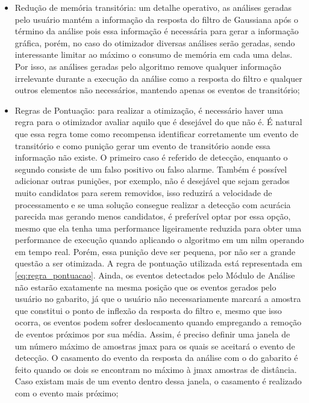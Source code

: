 \begin{itemize}

\item Redução de memória transitória: um detalhe operativo, as
análises geradas pelo usuário mantém a informação da resposta do
filtro de Gaussiana após o término da análise pois essa informação é
necessária para gerar a informação gráfica, porém, no caso do
otimizador diversas análises serão geradas, sendo interessante limitar
ao máximo o consumo de memória em cada uma delas. Por isso, as
análises geradas pelo algoritmo remove qualquer informação irrelevante
durante a execução da análise como a resposta do filtro e qualquer
outros elementos não necessários, mantendo apenas os eventos de
transitório;

\item Regras de Pontuação: para realizar a otimização, é necessário
haver uma regra para o otimizador avaliar aquilo que é desejável do
que não é. É natural que essa regra tome como recompensa identificar
corretamente um evento de transitório e como punição gerar um evento
de transitório aonde essa informação não existe. O primeiro caso é
referido de detecção, enquanto o segundo consiste de um falso positivo
ou falso alarme. Também é possível adicionar outras punições, por
exemplo, não é desejável que sejam gerados muito candidatos para serem
removidos, isso reduzirá a velocidade de processamento e se uma
solução consegue realizar a detecção com acurácia parecida mas gerando
menos candidatos, é preferível optar por essa opção, mesmo que ela
tenha uma performance ligeiramente reduzida para obter uma performance
de execução quando aplicando o algoritmo em um \gls{nilm} operando em
tempo real. Porém, essa punição deve ser pequena, por não ser a
grande questão a ser otimizada. A regra de pontuação utilizada está
representada em \ref{eq:regra_pontuacao}. Ainda, os eventos detectados
pelo Módulo de Análise não estarão exatamente na mesma posição que os
eventos gerados pelo usuário no gabarito, já que o usuário não
necessariamente marcará a amostra que constitui o ponto de inflexão da
resposta do filtro e, mesmo que isso ocorra, os eventos podem sofrer
deslocamento quando empregando a remoção de eventos próximos por sua
média. Assim, é preciso definir uma janela de um número máximo de
amostras \acs{jmax} para os quais se aceitará o evento de detecção. O
casamento do evento da resposta da análise com o do gabarito é feito
quando os dois se encontram no máximo à \acs{jmax} amostras de
distância. Caso existam mais de um evento dentro dessa janela, o
casamento é realizado com o evento mais próximo;

\end{itemize}
